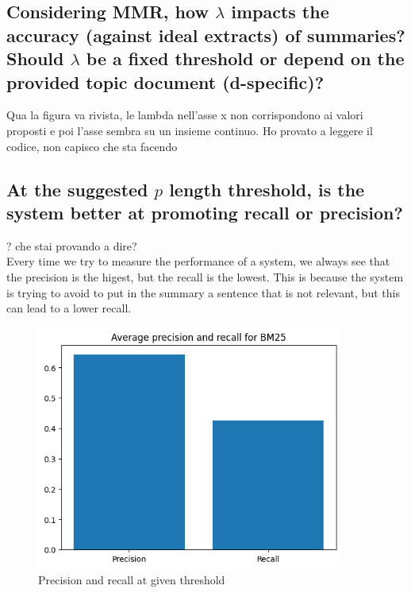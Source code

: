 \subsection{Considering MMR, how $\lambda$ impacts the accuracy (against ideal extracts) of summaries? Should $\lambda$ be a fixed threshold or depend on the provided topic document (d-specific)?}
Qua la figura va rivista, le lambda nell'asse x non corrispondono ai valori proposti e poi l'asse sembra su un insieme continuo. Ho provato a leggere il codice, non capisco che sta facendo 
\subsection{At the suggested $p$ length threshold, is the system better at promoting recall or precision?}

? che stai provando a dire? \\Every time we try to measure the performance of a system, we always see that the precision is the higest, but the recall is the lowest. This is because the system is trying to avoid to put in the summary a sentence that is not relevant, but this can lead to a lower recall.

\begin{figure}
    \centering
    \includegraphics[width=0.9\textwidth]{images/pre_rec.png}
    \caption{Precision and recall at given threshold}
    \label{fig:Precision and recall}
\end{figure}